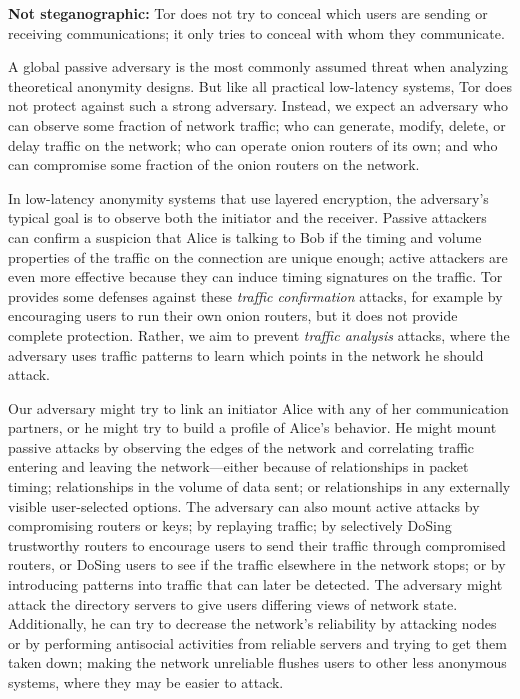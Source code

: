 \documentclass[times,10pt,twocolumn]{article}
\begin{document}
\textbf{Not steganographic:} Tor does not try to conceal which users are
sending or receiving communications; it only tries to conceal with whom
they communicate.

\label{subsec:threat-model}

A global passive adversary is the most commonly assumed threat when
analyzing theoretical anonymity designs. But like all practical
low-latency systems, Tor does not protect against such a strong
adversary. Instead, we expect an adversary who can observe some fraction
of network traffic; who can generate, modify, delete, or delay traffic
on the network; who can operate onion routers of its own; and who can
compromise some fraction of the onion routers on the network.


In low-latency anonymity systems that use layered encryption, the
adversary's typical goal is to observe both the initiator and the
receiver. Passive attackers can confirm a suspicion that Alice is
talking to Bob if the timing and volume properties of the traffic on the
connection are unique enough; active attackers are even more effective
because they can induce timing signatures on the traffic. Tor provides
some defenses against these \emph{traffic confirmation} attacks, for
example by encouraging users to run their own onion routers, but it does
not provide complete protection. Rather, we aim to prevent \emph{traffic
analysis} attacks, where the adversary uses traffic patterns to learn
which points in the network he should attack.

Our adversary might try to link an initiator Alice with any of her
communication partners, or he might try to build a profile of Alice's
behavior. He might mount passive attacks by observing the edges of the
network and correlating traffic entering and leaving the network---either
because of relationships in packet timing; relationships in the volume
of data sent; or relationships in any externally visible user-selected
options. The adversary can also mount active attacks by compromising
routers or keys; by replaying traffic; by selectively DoSing trustworthy
routers to encourage users to send their traffic through compromised
routers, or DoSing users to see if the traffic elsewhere in the
network stops; or by introducing patterns into traffic that can later be
detected. The adversary might attack the directory servers to give users
differing views of network state. Additionally, he can try to decrease
the network's reliability by attacking nodes or by performing antisocial
activities from reliable servers and trying to get them taken down;
making the network unreliable flushes users to other less anonymous
systems, where they may be easier to attack.
\end{document}
